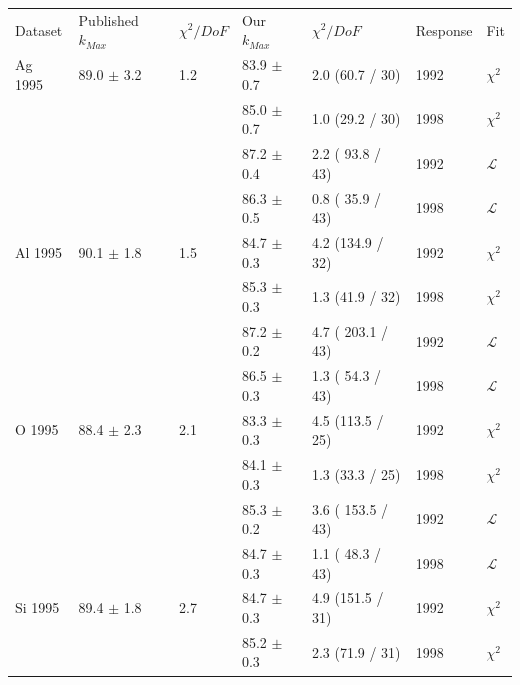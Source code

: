 \begin{table}[h]
  \begin{center}
    \begin{tabular}{|l||l|l|l|l|l|l|}
      \hline
      Dataset & Published $k_{Max}$ & $\chi^2 / DoF$ & Our $k_{Max}$ & $\chi^2 / DoF$  & Response & Fit \\
      \hhline{|=||=|=|=|=|=|=|}
       Ag 1995   & 89.0 $\pm$ 3.2 & 1.2 &83.9 $\pm$ 0.7 &  2.0 (60.7 / 30)  & 1992 & $\chi^2$ \\  
                 &                &     &85.0 $\pm$ 0.7 &  1.0 (29.2 / 30)  & 1998 & $\chi^2$ \\  
                                                                             
                &                &     & 87.2 $\pm$ 0.4 & 2.2 ( 93.8 / 43) & 1992 & $\mathcal{L}$ \\
                &                &     & 86.3 $\pm$ 0.5 & 0.8 ( 35.9 / 43) & 1998 & $\mathcal{L}$ \\      
      \hline                                                                
       Al 1995   & 90.1 $\pm$ 1.8 & 1.5 &84.7 $\pm$ 0.3 &  4.2 (134.9 / 32) & 1992 & $\chi^2$ \\  
                 &                &     &85.3 $\pm$ 0.3 &  1.3 (41.9 / 32)  & 1998 & $\chi^2$ \\  
                                                                            
                &                &     & 87.2 $\pm$ 0.2 & 4.7 ( 203.1 / 43) & 1992 & $\mathcal{L}$ \\
                &                &     & 86.5 $\pm$ 0.3 & 1.3 ( 54.3 / 43) & 1998 & $\mathcal{L}$ \\
      \hline                                                                
       O 1995    & 88.4 $\pm$ 2.3 & 2.1 &83.3 $\pm$ 0.3 &  4.5 (113.5 / 25) & 1992 & $\chi^2$ \\  
                 &                &     &84.1 $\pm$ 0.3 &  1.3 (33.3 / 25)  & 1998 & $\chi^2$ \\  
                                                                            
                &                &     & 85.3 $\pm$ 0.2 & 3.6 ( 153.5 / 43)& 1992 & $\mathcal{L}$\\
                &                &     & 84.7 $\pm$ 0.3 & 1.1 ( 48.3 / 43) & 1998 & $\mathcal{L}$\\
      \hline                                                                     
       Si 1995   & 89.4 $\pm$ 1.8 & 2.7 &84.7 $\pm$ 0.3 &  4.9 (151.5 / 31) & 1992 & $\chi^2$ \\  
                 &                &     &85.2 $\pm$ 0.3 &  2.3 (71.9 / 31)  & 1998 & $\chi^2$ \\  
                                                                             

\end{tabular}
\end{center}
\end{table}
